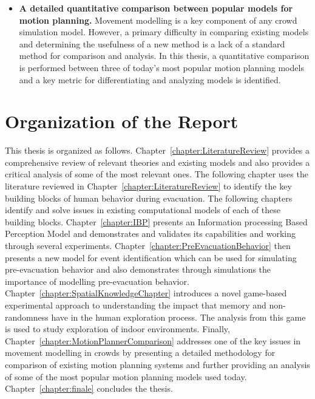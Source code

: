 \begin{itemize}
    \item \textbf{A detailed quantitative comparison between popular models for motion planning.} Movement modelling is a key component of any crowd simulation model. However, a primary difficulty in comparing existing models and determining the usefulness of a new method is a lack of a standard method for comparison and analysis. In this thesis, a quantitative comparison is performed between three of today's most popular motion planning models and a key metric for differentiating and analyzing models is identified.


\end{itemize}


\section{Organization of the Report}
\label{Intro:Organisation}

 This thesis is organized as follows. Chapter~\ref{chapter:LiteratureReview} provides a comprehensive review of relevant theories and existing models and also provides a critical analysis of some of the most relevant ones. The following chapter uses the literature reviewed in Chapter~\ref{chapter:LiteratureReview} to identify the key building blocks of human behavior during evacuation. The following chapters identify and solve issues in existing computational models of each of these building blocks.
Chapter~\ref{chapter:IBP} presents an Information processing Based Perception Model and demonstrates and validates its capabilities and working through several experiments. Chapter~\ref{chapter:PreEvacuationBehavior} then presents a new model for event identification which can be used for simulating pre-evacuation behavior and also demonstrates through simulations the importance of modelling pre-evacuation behavior. Chapter~\ref{chapter:SpatialKnowledgeChapter} introduces a novel game-based experimental approach to understanding the impact that memory and non-randomness have in the human exploration process. The analysis from this game is used to study exploration of indoor environments. Finally, Chapter~\ref{chapter:MotionPlannerComparison} addresses one of the key issues in movement modelling in crowds by presenting a detailed methodology for comparison of existing motion planning systems and further providing an analysis of some of the most popular motion planning models used today. Chapter~\ref{chapter:finale} concludes the thesis.

